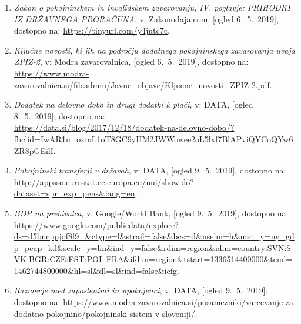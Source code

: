 \documentclass[12pt, a4paper]{article}
\begin{document}
\begin{enumerate}
\item
\label{ZPIZ2}
\emph{Zakon o pokojninskem in invalidskem zavarovanju, IV. poglavje: PRIHODKI IZ DRŽAVNEGA PRORAČUNA}, v: Zakonodaja.com, [ogled 6.~5.~2019], dostopno na: \url{https://tinyurl.com/y4jutc7c}.

\item
\label{Novosti ZIPZ2}
\emph{Ključne novosti, ki jih na področju dodatnega pokojninskega zavarovanja uvaja ZPIZ-2}, v: Modra zavarovalnica, [ogled 6.~5.~2019], dostopno na: \url{https://www.modra-zavarovalnica.si/fileadmin/Javne_objave/Kljucne_novosti_ZPIZ-2.pdf}.

\item
\label{Dodatek na delovno dobo in drugi dodatki k plači}
\emph{Dodatek na delovno dobo in drugi dodatki k plači}, v: DATA, [ogled 8.~5.~2019], dostopno na:\\ \url{https://data.si/blog/2017/12/18/dodatek-na-delovno-dobo/?fbclid=IwAR1u_oxmL1oT8GC9yIIM2JWWowee2oL5lxf7BlAPviQYCoQYw6ZR8pGEilI}.



\item
\label{Pokojninski transferji v državah}
\emph{Pokojninski transferji v državah}, v: DATA, [ogled 9.~5.~2019], dostopno na: \url{http://appsso.eurostat.ec.europa.eu/nui/show.do?dataset=spr_exp_pens&lang=en}.

\item
\label{BDP na prebivalca}
\emph{BDP na prebivalca}, v: Google/World Bank, [ogled 9.~5.~2019], dostopno na: \url{https://www.google.com/publicdata/explore?ds=d5bncppjof8f9_&ctype=l&strail=false&bcs=d&nselm=h&met_y=ny_gdp_pcap_kd&scale_y=lin&ind_y=false&rdim=region&idim=country:SVN:SVK:BGR:CZE:EST:POL:FRA&ifdim=region&tstart=1336514400000&tend=1462744800000&hl=sl&dl=sl&ind=false&icfg}.

\item
\label{Razmerje med zaposlenimi in upokojenci}
\emph{Razmerje med zaposlenimi in upokojenci}, v: DATA, [ogled 9.~5.~2019], dostopno na: \url{https://www.modra-zavarovalnica.si/posamezniki/varcevanje-za-dodatno-pokojnino/pokojninski-sistem-v-sloveniji/}.
\end{enumerate}
\end{document}
